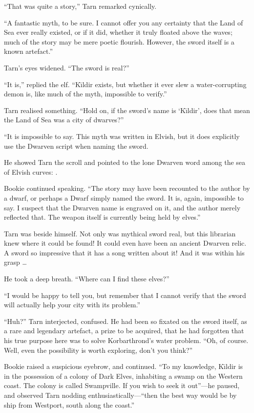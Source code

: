 ``That was quite a story,'' Tarn remarked cynically.

``A fantastic myth, to be sure.  I cannot offer you any certainty that the Land of Sea ever really existed, or if it did, whether it truly floated above the waves; much of the story may be mere poetic flourish.  However, the sword itself is a known artefact.''

Tarn's eyes widened.  ``The sword is real?''

``It is,'' replied the elf.  ``K\=\i{}ldir exists, but whether it ever slew a water-corrupting demon is, like much of the myth, impossible to verify.''

Tarn realised something.  ``Hold on, if the sword's name is `K\=\i{}ldir', does that mean the Land of Sea was a city of dwarves?''

``It is impossible to say.  This myth was written in Elvish, but it does explicitly use the Dwarven script when naming the sword.

He showed Tarn the scroll and pointed to the lone Dwarven word among the sea of Elvish curves: .

Bookie continued speaking.  ``The story may have been recounted to the author by a dwarf, or perhaps a Dwarf simply named the sword.  It is, again, impossible to say.  I suspect that the Dwarven name is engraved on it, and the author merely reflected that.  The weapon itself is currently being held by elves.''

Tarn was beside himself.  Not only was mythical sword real, but this librarian knew where it could be found!  It could even have been an ancient Dwarven relic.  A sword so impressive that it has a song written about it!  And it was within his grasp \ldots

He took a deep breath.  ``Where can I find these elves?''

``I would be happy to tell you, but remember that I cannot verify that the sword will actually help your city with its problem.''

``Huh?'' Tarn interjected, confused.  He had been so fixated on the sword itself, as a rare and legendary artefact, a prize to be acquired, that he had forgotten that his true purpose here was to solve Korbarthrond's water problem.  ``Oh, of course.  Well, even the possibility is worth exploring, don't you think?''

Bookie raised a suspicious eyebrow, and continued.  ``To my knowledge, K\=\i{}ldir is in the possession of a colony of Dark Elves, inhabiting a swamp on the Western coast.  The colony is called Swampville.  If you wish to seek it out''---he paused, and observed Tarn nodding enthusiastically---``then the best way would be by ship from Westport, south along the coast.''

